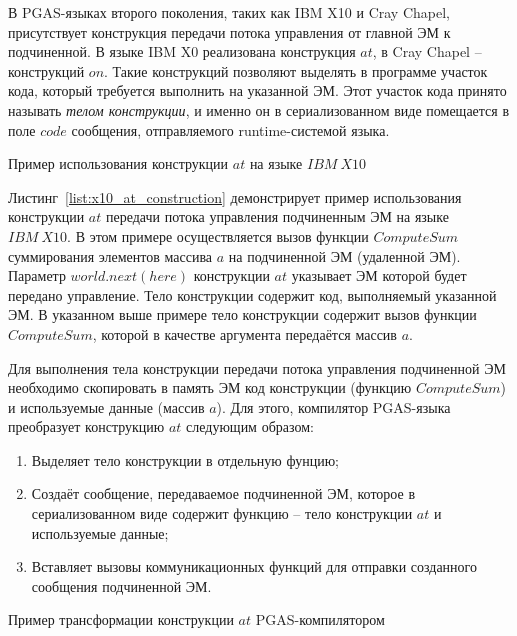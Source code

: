В PGAS-языках второго поколения, таких как IBM X10 и Cray Chapel, присутствует конструкция передачи потока управления от главной ЭМ к подчиненной. В языке
IBM X0 реализована конструкция $at$, в Cray Chapel -- конструкций $on$. Такие
конструкций позволяют выделять в программе участок кода, который требуется
выполнить на указанной ЭМ. Этот участок кода принято называть \textit{телом конструкции}, и именно он в сериализованном виде помещается в поле $code$ сообщения, отправляемого runtime-системой языка.

\begin{ListingEnv}[ht]
	\small {}
    \caption{Пример использования конструкции $at$ на языке $IBM\ X10$}
    \label{list:x10_at_construction}
\end{ListingEnv}

Листинг~\ref{list:x10_at_construction} демонстрирует пример использования
конструкции $at$ передачи потока управления подчиненным ЭМ на языке $IBM\ X10$.
В этом примере осуществляется вызов функции $ComputeSum$ суммирования элементов
массива $a$ на подчиненной ЭМ (удаленной ЭМ). Параметр $world.next(here)$
конструкции $at$ указывает ЭМ которой будет передано управление. Тело
конструкции содержит код, выполняемый указанной ЭМ. В указанном выше примере
тело конструкции содержит вызов функции $ComputeSum$, которой в качестве
аргумента передаётся массив $a$.

Для выполнения тела конструкции передачи потока управления подчиненной ЭМ
необходимо скопировать в память ЭМ код конструкции (функцию $ComputeSum$)
и используемые данные (массив $a$). Для этого, компилятор PGAS-языка преобразует
конструкцию $at$ следующим образом:
\begin{enumerate}
\item Выделяет тело конструкции в отдельную фунцию;
\item Создаёт сообщение, передаваемое подчиненной ЭМ, которое в сериализованном
  виде содержит функцию -- тело конструкции $at$ и используемые данные;
\item Вставляет вызовы коммуникационных функций для отправки созданного
  сообщения подчиненной ЭМ.
\end{enumerate}

\begin{ListingEnv}[ht]
	\small {}
    \caption{Пример трансформации конструкции $at$ PGAS-компилятором}
    \label{list:x10_intermediate_at_construction}
\end{ListingEnv}

